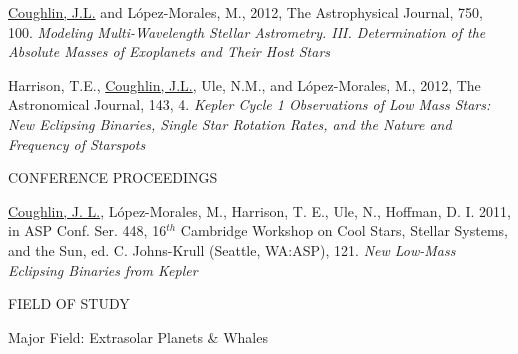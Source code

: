 \hangindent=0.5in \noindent \underline{Coughlin, J.L.} and L\'opez-Morales, M., 2012, The Astrophysical Journal, 750, 100. \textit{Modeling Multi-Wavelength Stellar Astrometry. III. Determination of the Absolute Masses of Exoplanets and Their Host Stars}

\hangindent=0.5in \noindent Harrison, T.E., \underline{Coughlin, J.L.}, Ule, N.M., and L\'opez-Morales, M., 2012, The Astronomical Journal, 143, 4. \textit{Kepler Cycle 1 Observations of Low Mass Stars: New Eclipsing Binaries, Single Star Rotation Rates, and the Nature and Frequency of Starspots}

\medskip
\begin{center}
CONFERENCE PROCEEDINGS
\end{center}

\hangindent=0.5in \noindent \underline{Coughlin, J. L.}, L\'opez-Morales, M., Harrison, T. E., Ule, N., Hoffman, D. I. 2011, in ASP Conf. Ser. 448, 16$^{th}$ Cambridge Workshop on Cool Stars, Stellar Systems, and the Sun, ed. C. Johns-Krull (Seattle, WA:ASP), 121. \textit{New Low-Mass Eclipsing Binaries from Kepler}

\medskip

\begin{center}
FIELD OF STUDY
\end{center}
\begin{flushleft}
Major Field: Extrasolar Planets \& Whales
\end{flushleft}